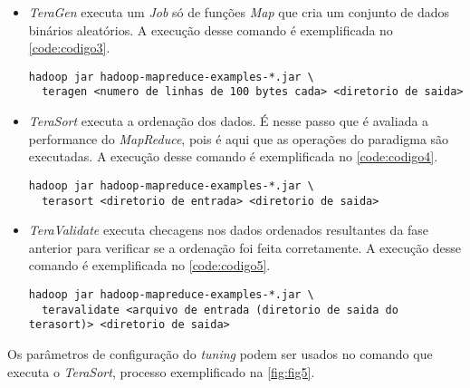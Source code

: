 \begin{itemize}
  \item \textit{TeraGen} executa um \textit{Job} só de funções \textit{Map} que cria um conjunto de dados binários aleatórios. A execução desse comando é exemplificada no \autoref{code:codigo3}.
  
  \begin{lstlisting}[caption={Exemplo de execução do \textit{TeraGen} adaptado de \cite{HadoopBook15}}, label=code:codigo3]
  hadoop jar hadoop-mapreduce-examples-*.jar \
  teragen <numero de linhas de 100 bytes cada> <diretorio de saida>
  \end{lstlisting}
  
  \item \textit{TeraSort} executa a ordenação dos dados. É nesse passo que é avaliada a performance do \textit{MapReduce}, pois é aqui que as operações do paradigma são executadas. A execução desse comando é exemplificada no \autoref{code:codigo4}.
  \begin{lstlisting}[caption={Exemplo de execução do \textit{TeraSort} adaptado de \cite{HadoopBook15}}, label=code:codigo4]
  hadoop jar hadoop-mapreduce-examples-*.jar \
  terasort <diretorio de entrada> <diretorio de saida>
  \end{lstlisting}  

  \item \textit{TeraValidate} executa checagens nos dados ordenados resultantes da fase anterior para verificar se a ordenação foi feita corretamente. A execução desse comando é exemplificada no \autoref{code:codigo5}.
  \begin{lstlisting}[caption={Exemplo de execução do \textit{TeraValidate} adaptado de \cite{HadoopBook15}}, label=code:codigo5]
  hadoop jar hadoop-mapreduce-examples-*.jar \
  teravalidate <arquivo de entrada (diretorio de saida do terasort)> <diretorio de saida>
  \end{lstlisting}

\end{itemize}

Os parâmetros de configuração do \textit{tuning} podem ser usados no comando que executa o \textit{TeraSort}, processo exemplificado na \autoref{fig:fig5}.



